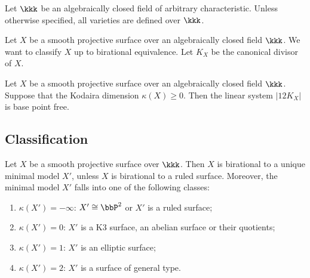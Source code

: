 Let \(\kkk\) be an algebraically closed field of arbitrary characteristic.
Unless otherwise specified, all varieties are defined over \(\kkk\).

Let \(X\) be a smooth projective surface over an algebraically closed field \(\kkk\). 
We want to classify \(X\) up to birational equivalence.
Let \(K_X\) be the canonical divisor of \(X\).


    \begin{theorem}\label{thm:12K_is_base_point_free_on_surfaces_with_nonnegative_kodaira_dimension}
        Let \(X\) be a smooth projective surface over an algebraically closed field \(\kkk\).
        Suppose that the Kodaira dimension \(\kappa(X)\geq 0\).
        Then the linear system \(|12K_X|\) is base point free.
    \end{theorem}

\subsection{Classification}

    \begin{theorem}\label{thm:enriques_kodaira_classification}
        Let \(X\) be a smooth projective surface over \(\kkk\).
        Then \(X\) is birational to a unique minimal model \(X'\), unless \(X\) is birational to a ruled surface.
        Moreover, the minimal model \(X'\) falls into one of the following classes:
        \begin{enumerate}
            \item \(\kappa(X')=-\infty\): \(X'\cong \bbP^2\) or \(X'\) is a ruled surface;
            \item \(\kappa(X')=0\): \(X'\) is a K3 surface, an abelian surface or their quotients;
            \item \(\kappa(X')=1\): \(X'\) is an elliptic surface;
            \item \(\kappa(X')=2\): \(X'\) is a surface of general type.
        \end{enumerate}
    \end{theorem}

